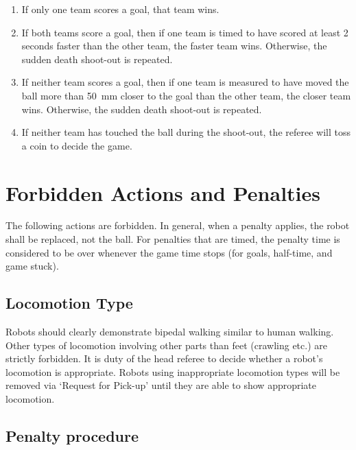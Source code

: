 \documentclass[12pt]{article}
\begin{document}
\begin{enumerate}

\item If only one team scores a goal, that team wins.

\item If both teams score a goal, then if one team is timed to have scored at least 2 seconds faster than the other team, the faster team wins. Otherwise, the sudden death shoot-out is repeated.

\item If neither team scores a goal, then if one team is measured to have moved the ball more than 50~mm closer to the goal than the other team, the closer team wins. Otherwise, the sudden death shoot-out is repeated.

\item If neither team has touched the ball during the shoot-out, the referee will toss a coin to decide the game.

\end{enumerate}


\newpage


\section{Forbidden Actions and Penalties}
\label{sec:forbidden_act}

The following actions are forbidden. In general, when a penalty applies, the robot shall be replaced, not the ball. For penalties that are timed, the penalty time is considered to be over whenever the game time stops (for goals, half-time, and game stuck).

\subsection{Locomotion Type}
\label{sec:locomotion_type}

Robots should clearly demonstrate bipedal walking similar to human walking. Other types of locomotion involving other parts than feet (crawling etc.) are strictly forbidden. It is duty of the head referee to decide whether a robot's locomotion is appropriate. Robots using inappropriate locomotion types will be removed via `Request for Pick-up' until they are able to show appropriate locomotion.

\subsection{Penalty procedure}
\label{sec:penalty_procedure}
\end{document}
